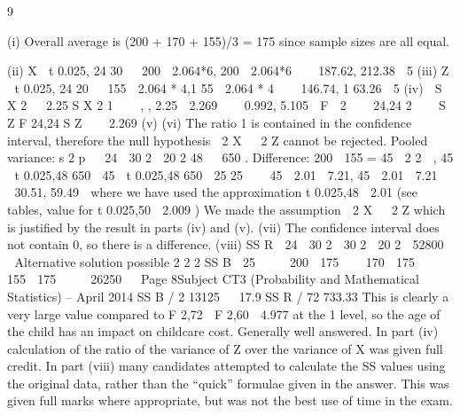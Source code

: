 \documentclass[a4paper,12pt]{article}
\begin{document}

9
\item (i) Overall average is (200 + 170 + 155)/3 = 175 since sample sizes are all equal.
\item (ii) X  t 0.025, 24
30
  200  2.064*6, 200  2.064*6    187.62, 212.38 
5
(iii) Z  t 0.025, 24
20
  155  2.064 * 4,1 55  2.064 * 4    146.74, 1 63.26 
5
(iv)  S X 2
  2.25
S X 2
1



,
, 2.25  2.269    0.992, 5.105 
F
 2
  
24,24
2

  S Z F 24,24 S Z
   2.269
(v)
(vi)
The ratio 1 is contained in the confidence interval, therefore the null
hypothesis  2 X   2 Z cannot be rejected.
Pooled variance:
s 2 p


24  30 2  20 2
48
  650 .
Difference: 200  155 = 45

2
2 
, 45  t 0.025,48 650
 45  t 0.025,48 650

25
25 

 45  2.01  7.21, 45  2.01  7.21    30.51, 59.49 
where we have used the approximation t 0.025,48  2.01 (see tables, value for
t 0.025,50  2.009 )
We made the assumption  2 X   2 Z which is justified by the result in parts (iv)
and (v).
(vii) The confidence interval does not contain 0, so there is a difference.
(viii) SS R  24  30 2  30 2  20 2  52800


Alternative solution possible
2
2
2
SS B  25     200  175    170  175    155  175     26250


Page 8Subject CT3 (Probability and Mathematical Statistics) – April 2014 
SS B / 2 13125

 17.9
SS R / 72 733.33
This is clearly a very large value compared to F 2,72  F 2,60  4.977 at the 1%
level, so the age of the child has an impact on childcare cost.
Generally well answered. In part (iv) calculation of the ratio of the variance of Z over the
variance of X was given full credit. In part (viii) many candidates attempted to calculate the
SS values using the original data, rather than the “quick” formulae given in the answer. This
was given full marks where appropriate, but was not the best use of time in the exam.
\end{document}
